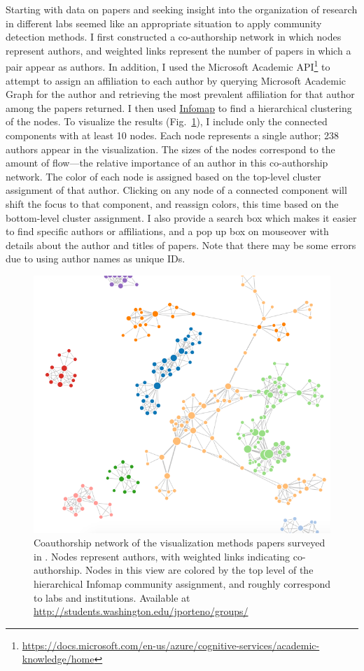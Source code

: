 Starting with data on papers and seeking insight into the organization
of research in different labs seemed like an appropriate situation to
apply community detection methods. I first constructed a co-authorship
network in which nodes represent authors, and weighted links represent
the number of papers in which a pair appear as authors. In addition, I
used the Microsoft Academic API\footnote{\url{https://docs.microsoft.com/en-us/azure/cognitive-services/academic-knowledge/home}}
to attempt to assign an affiliation to each author by querying Microsoft
Academic Graph for the author and retrieving the most prevalent
affiliation for that author among the papers returned. I then used
\protect\hyperlink{the-dynamical-perspective}{Infomap} to find a
hierarchical clustering of the nodes. To visualize the results
(Fig.~\ref{fig:groupsvis}), I include only the connected components with
at least 10 nodes. Each node represents a single author; 238 authors
appear in the visualization. The sizes of the nodes correspond to the
amount of flow---the relative importance of an author in this
co-authorship network. The color of each node is assigned based on the
top-level cluster assignment of that author. Clicking on any node of a
connected component will shift the focus to that component, and reassign
colors, this time based on the bottom-level cluster assignment. I also
provide a search box which makes it easier to find specific authors or
affiliations, and a pop up box on mouseover with details about the
author and titles of papers. Note that there may be some errors due to
using author names as unique IDs.

\begin{figure}
\centering
\includegraphics{img/groups_vis.png}
\caption{Coauthorship network of the visualization methods papers
surveyed in \autocite{vehlow_state_2015}. Nodes represent authors, with
weighted links indicating co-authorship. Nodes in this view are colored
by the top level of the hierarchical Infomap community assignment, and
roughly correspond to labs and institutions. Available at
\url{http://students.washington.edu/jporteno/groups/}}\label{fig:groupsvis}
\end{figure}

